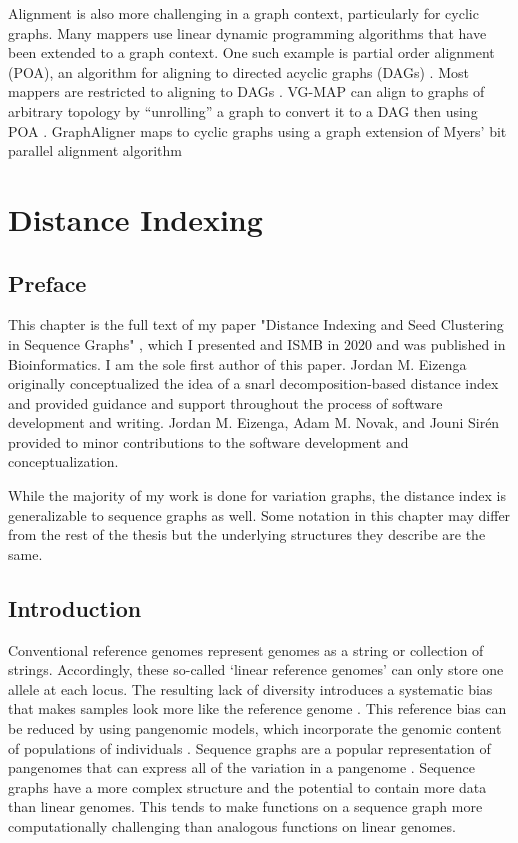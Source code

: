 \documentclass[11pt]{ucscthesis}
\begin{document}
Alignment is also more challenging in a graph context, particularly for cyclic graphs.
Many mappers use linear dynamic programming algorithms that have been extended to a graph context.
One such example is partial order alignment (POA), an algorithm for aligning to directed acyclic graphs (DAGs) \cite{lee_multiple_2002}.
Most mappers are restricted to aligning to DAGs \cite{schneeberger_simultaneous_2009,kim_hisat2_2019,rakocevic_fast_2019}.
VG-MAP can align to graphs of arbitrary topology by ``unrolling'' a graph to convert it to a DAG then using POA \cite{garrison_variation_2018}.
GraphAligner maps to cyclic graphs using a graph extension of Myers' bit parallel alignment algorithm \cite{rautiainen_bit-parallel_2019}

\chapter{Distance Indexing}
\label{chapter:distance}

\section{Preface}
This chapter is the full text of my paper "Distance Indexing and Seed Clustering in Sequence Graphs" \cite{chang_distance_2020}, which I presented and ISMB in 2020 and was published in Bioinformatics.
I am the sole first author of this paper. 
Jordan M. Eizenga originally conceptualized the idea of a snarl decomposition-based distance index and provided guidance and support throughout the process of software development and writing.
Jordan M. Eizenga, Adam M. Novak, and Jouni Sirén provided to minor contributions to the software development and conceptualization. 

While the majority of my work is done for variation graphs, the distance index is generalizable to sequence graphs as well.
Some notation in this chapter may differ from the rest of the thesis but the underlying structures they describe are the same.

\newpage

\section{Introduction}
Conventional reference genomes represent genomes as a string or collection of strings.
Accordingly, these so-called ‘linear reference genomes’ can only store one allele at each locus.
The resulting lack of diversity introduces a systematic bias that makes samples look more like the reference genome \cite{zook_integrating_2014}.
This reference bias can be reduced by using pangenomic models, which incorporate the genomic content of populations of individuals \cite{noauthor_computational_2016}.
Sequence graphs are a popular representation of pangenomes that can express all of the variation in a pangenome \cite{paten_genome_2017}. 
Sequence graphs have a more complex structure and the potential to contain more data than linear genomes.
This tends to make functions on a sequence graph more computationally challenging than analogous functions on linear genomes.
\end{document}
